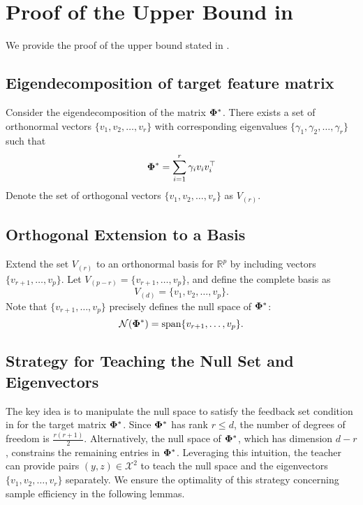 \iffalse

\section{Proof of the Upper Bound in }

We provide the proof of the upper bound stated in .

\subsection{Eigendecomposition of target feature matrix}

Consider the eigendecomposition of the matrix $\boldsymbol{\Phi}^*$. There exists a set of orthonormal vectors $\{v_1, v_2, \ldots, v_r\}$ with corresponding eigenvalues $\{\gamma_1, \gamma_2, \ldots, \gamma_r\}$ such that
\begin{align}
    \boldsymbol{\Phi}^* = \sum_{i=1}^r \gamma_i v_i v_i^{\top} \label{eq:target}
\end{align}
Denote the set of orthogonal vectors $\{v_1, v_2, \ldots, v_r\}$ as $V_{(r)}$.

\subsection{Orthogonal Extension to a Basis}

Extend the set $V_{(r)}$ to an orthonormal basis for $\mathbb{R}^p$ by including vectors $\{v_{r+1}, \ldots, v_p\}$. Let $V_{(p-r)} = \{v_{r+1}, \ldots, v_p\}$, and define the complete basis as
\[
    V_{(d)} = \{v_1, v_2, \ldots, v_p\}.
\]
Note that $\{v_{r+1}, \ldots, v_p\}$ precisely defines the null space of $\boldsymbol{\Phi}^*$:
\[
    \mathcal{N}(\boldsymbol{\Phi}^*) = \text{span}\{v_{r+1}, \ldots, v_p\}.
\]

\subsection{Strategy for Teaching the Null Set and Eigenvectors}

The key idea is to manipulate the null space to satisfy the feedback set condition in  for the target matrix $\boldsymbol{\Phi}^*$. Since $\boldsymbol{\Phi}^*$ has rank $r \leq d$, the number of degrees of freedom is $\frac{r(r+1)}{2}$. Alternatively, the null space of $\boldsymbol{\Phi}^*$, which has dimension $d - r$, constrains the remaining entries in $\boldsymbol{\Phi}^*$. Leveraging this intuition, the teacher can provide pairs $(y, z) \in \mathcal{X}^2$ to teach the null space and the eigenvectors $\{v_1, v_2, \ldots, v_r\}$ separately. We ensure the optimality of this strategy concerning sample efficiency in the following lemmas.

